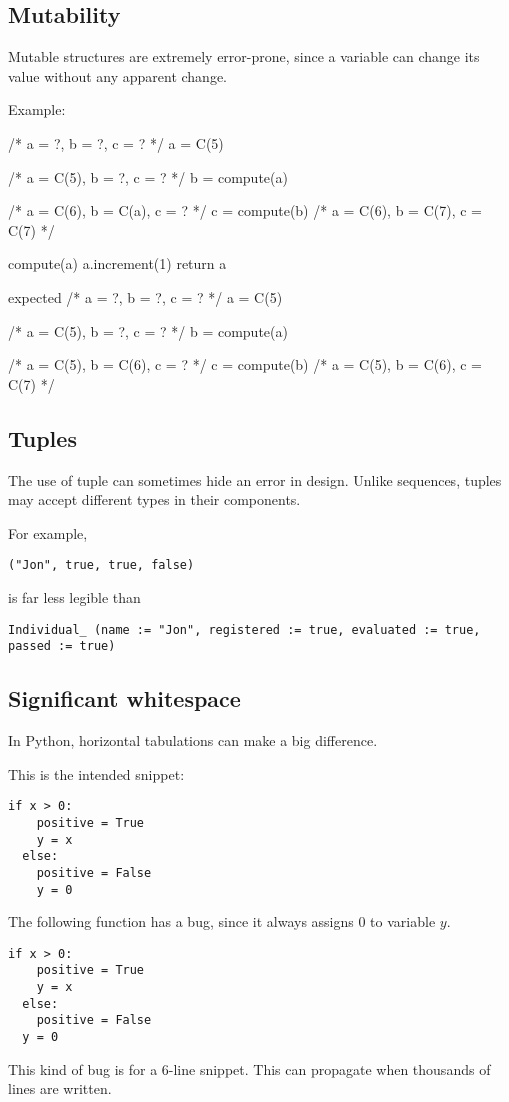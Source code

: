 \subsection{Mutability}
Mutable structures are extremely error-prone, since a variable can change its value without any apparent change.

Example:

/* a = ?, b = ?, c = ? */
a = C(5)

/* a = C(5), b = ?, c = ? */
b = compute(a)

/* a = C(6), b = C(a), c = ? */
c = compute(b)
/* a = C(6), b = C(7), c = C(7) */


compute(a)
a.increment(1)
return a


expected
/* a = ?, b = ?, c = ? */
a = C(5)

/* a = C(5), b = ?, c = ? */
b = compute(a)

/* a = C(5), b = C(6), c = ? */
c = compute(b)
/* a = C(5), b = C(6), c = C(7) */

\subsection{Tuples}

The use of tuple can sometimes hide an error in design.
Unlike sequences, tuples may accept different types in their components.

For example,

\begin{lstlisting}[label={lst:exampleJonTuple}]
  ("Jon", true, true, false)
\end{lstlisting}

is far less legible than

\begin{lstlisting}[label={lst:exampleJonIndividual}]
  Individual_ (name := "Jon", registered := true, evaluated := true, passed := true)
\end{lstlisting}

\subsection{Significant whitespace}

In Python, horizontal tabulations can make a big difference.

This is the intended snippet:

\begin{lstlisting}[label={lst:snippetInPython1}]
  if x > 0:
    positive = True
    y = x
  else:
    positive = False
    y = 0
\end{lstlisting}


The following function has a bug, since it always assigns 0 to variable $y$.

\begin{lstlisting}[label={lst:snippetInPython2}]
  if x > 0:
    positive = True
    y = x
  else:
    positive = False
  y = 0
\end{lstlisting}

This kind of bug is for a 6-line snippet.
This can propagate when thousands of lines are written.

